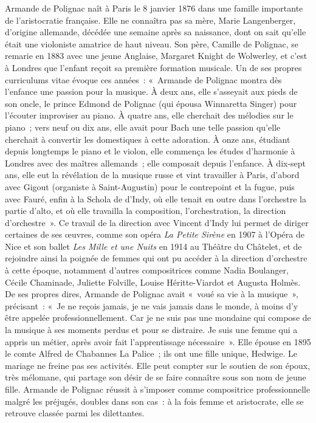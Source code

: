 \documentclass[a4paper, 12pt]{book}
\begin{document}
Armande de Polignac naît à Paris le 8 janvier 1876 dans une famille
importante de l'aristocratie française. Elle ne connaîtra pas sa mère,
Marie Langenberger, d'origine allemande, décédée une semaine après sa
naissance, dont on sait qu'elle était une violoniste amatrice de haut
niveau. Son père, Camille de Polignac, se remarie en 1883 avec une jeune
Anglaise, Margaret Knight de Wolwerley, et c'est à Londres que l'enfant
reçoit sa première formation musicale. Un de ses propres curriculums vitae
évoque ces années~: «~Armande de Polignac montra dès l'enfance une
passion pour la musique. À deux ans, elle s'asseyait aux pieds de son
oncle, le prince Edmond de Polignac (qui épousa Winnaretta Singer) pour
l'écouter improviser au piano. À quatre ans, elle cherchait des mélodies
sur le piano~; vers neuf ou dix ans, elle avait pour Bach une telle
passion qu'elle cherchait à convertir les domestiques à cette adoration.
À onze ans, étudiant depuis longtemps le piano et le violon, elle
commença les études d'harmonie à Londres avec des maîtres allemands~;
elle composait depuis l'enfance. À dix-sept ans, elle eut la révélation
de la musique russe et vint travailler à Paris, d'abord avec Gigout
(organiste à Saint-Augustin) pour le contrepoint et la fugue, puis avec
Fauré, enfin à la Schola de d'Indy, où elle tenait en outre dans
l'orchestre la partie d'alto, et où elle travailla la composition,
l'orchestration, la direction d'orchestre~». Ce travail de la direction
avec Vincent d'Indy lui permet de diriger certaines de ses œuvres, comme
son opéra \emph{La Petite Sirène} en 1907 à l'Opéra de Nice et son
ballet \emph{Les Mille et une Nuits} en 1914 au Théâtre du Châtelet, et
de rejoindre ainsi la poignée de femmes qui ont pu accéder à la
direction d'orchestre à cette époque, notamment d'autres compositrices
comme Nadia Boulanger, Cécile Chaminade, Juliette Folville, Louise
Héritte-Viardot et Augusta Holmès. De ses propres dires, Armande de
Polignac avait «~voué sa vie à la musique~», précisant~: «~Je ne reçois
jamais, je ne vais jamais dans le monde, à moins d'y être appelée
professionnellement. Car je ne suis pas une mondaine qui compose de la
musique à ses moments perdus et pour se distraire. Je suis une femme qui
a appris un métier, après avoir fait l'apprentissage nécessaire~». Elle
épouse en 1895 le comte Alfred de Chabannes La Palice~; ils ont une
fille unique, Hedwige. Le mariage ne freine pas ses activités. Elle peut
compter sur le soutien de son époux, très mélomane, qui partage son
désir de se faire connaître sous son nom de jeune fille. Armande de
Polignac réussit à s'imposer comme compositrice professionnelle malgré
les préjugés, doubles dans son cas~: à la fois femme et aristocrate,
elle se retrouve classée parmi les dilettantes.
\end{document}
